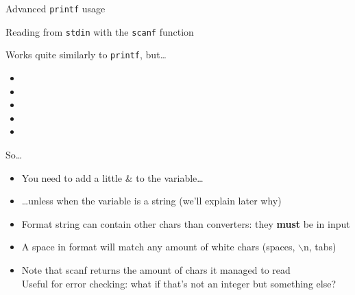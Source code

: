\begin{Coupe}
\begin{frame}{Advanced \texttt{printf} usage}
\end{frame}
\begin{frame}{Reading from \texttt{stdin} with the \texttt{scanf} function}
  \begin{block}{Works quite similarly to \texttt{printf}, but\ldots}
    \begin{itemize}
    \item {} 
    \item {} 
    \item {} 
    \item {} 
    \item {} 
    \end{itemize}
  \end{block}
  \begin{block}{So\ldots}
    \begin{itemize}
    \item You need to add a little \& to the variable\ldots
    \item \ldots unless when the variable is a string (we'll explain later why)
    \item Format string can contain other chars than converters: they
      \textbf{must} be in input
    \item A space in format will match any amount of white chars 
      {\small(spaces, $\backslash$n, tabs)}
    \item Note that scanf returns the amount of chars it managed to read\\
      {\small Useful for error checking: what if that's not an integer but
        something else?}
    \end{itemize}
  \end{block}
\end{frame}


\end{Coupe}
